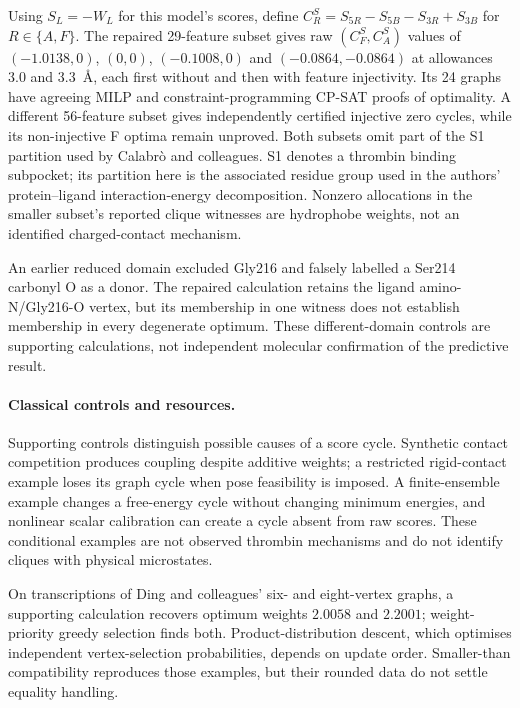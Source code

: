 \documentclass{article}
\begin{document}
Using \(S_L=-W_L\) for this model's scores, define \(C_R^S=S_{5R}-S_{5B}-S_{3R}+S_{3B}\) for \(R\in\{A,F\}\). The repaired 29-feature subset gives raw \((C_F^S,C_A^S)\) values of \((-1.0138,0)\), \((0,0)\), \((-0.1008,0)\) and \((-0.0864,-0.0864)\) at allowances 3.0 and 3.3~\AA, each first without and then with feature injectivity. Its 24 graphs have agreeing MILP and constraint-programming CP-SAT proofs of optimality. A different 56-feature subset gives independently certified injective zero cycles, while its non-injective F optima remain unproved. Both subsets omit part of the S1 partition used by Calabr\`o and colleagues. S1 denotes a thrombin binding subpocket; its partition here is the associated residue group used in the authors' protein--ligand interaction-energy decomposition. Nonzero allocations in the smaller subset's reported clique witnesses are hydrophobe weights, not an identified charged-contact mechanism.

An earlier reduced domain excluded Gly216 and falsely labelled a Ser214 carbonyl O as a donor. The repaired calculation retains the ligand amino-N/Gly216-O vertex, but its membership in one witness does not establish membership in every degenerate optimum. These different-domain controls are supporting calculations, not independent molecular confirmation of the predictive result.

\paragraph{Classical controls and resources.}
Supporting controls distinguish possible causes of a score cycle. Synthetic contact competition produces coupling despite additive weights; a restricted rigid-contact example loses its graph cycle when pose feasibility is imposed. A finite-ensemble example changes a free-energy cycle without changing minimum energies, and nonlinear scalar calibration can create a cycle absent from raw scores. These conditional examples are not observed thrombin mechanisms and do not identify cliques with physical microstates.

On transcriptions of Ding and colleagues' six- and eight-vertex graphs, a supporting calculation recovers optimum weights \(2.0058\) and \(2.2001\); weight-priority greedy selection finds both. Product-distribution descent, which optimises independent vertex-selection probabilities, depends on update order. Smaller-than compatibility reproduces those examples, but their rounded data do not settle equality handling.
\end{document}
